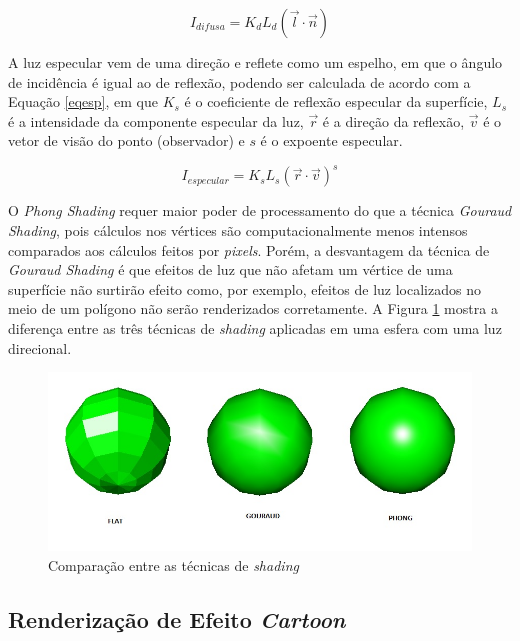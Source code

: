 {	\begin{equation}
		I_ {difusa} = K_ {d}L_ {d}( \overrightarrow{ l} \cdot \overrightarrow{ n}) 
	\label{eqdif}
	\end{equation}

	 A luz especular vem de uma direção e reflete como um espelho, em que o ângulo de incidência é igual ao de reflexão, podendo ser calculada de acordo com a Equação \ref{eqesp}, em que $K_ {s}$ é o coeficiente de reflexão especular da superfície, $L_ {s}$ é a intensidade da componente especular da luz, $\overrightarrow{ r}$ é a direção da reflexão, $\overrightarrow{v}$ é o vetor de visão do ponto (observador) e $s$ é o expoente especular.

	\begin{equation}
		I_ {especular} =K_ {s}L_ {s} (\overrightarrow{ r} \cdot \overrightarrow{ v})^s
	\label{eqesp}
	\end{equation}

	 O \textit{Phong Shading} requer maior poder de processamento do que a técnica \textit{Gouraud Shading}, pois cálculos nos vértices são computacionalmente menos intensos comparados aos cálculos feitos por \textit{pixels}. Porém, a desvantagem da técnica de \textit{Gouraud Shading} é que efeitos de luz que não afetam um vértice de uma superfície não surtirão efeito como, por exemplo, efeitos de luz localizados no meio de um polígono não serão renderizados corretamente. A Figura \ref{fgp} mostra a diferença entre as três técnicas de \textit{shading} aplicadas em uma esfera com uma luz direcional. 

	\begin{figure}[ht]
	\centering
		\includegraphics[keepaspectratio=true,scale=0.5]{figuras/flatgp.jpg}
	\caption{Comparação entre as técnicas de \textit{shading}}
	\label{fgp}
	\end{figure}

	\subsection{Renderização de Efeito \textit{Cartoon}}
	\label{cartoon}

}
